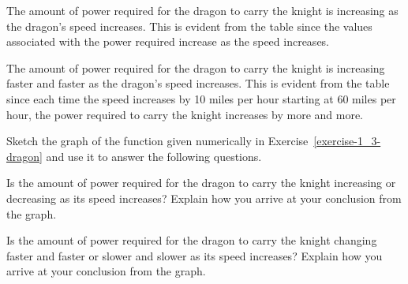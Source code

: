 \begin{solution}
    \begin{parts}
        \item The amount of power required for the dragon to carry the knight is increasing as the dragon's speed increases. This is evident from the table since the values associated with the power required increase as the speed increases.
        \item The amount of power required for the dragon to carry the knight is increasing faster and faster as the dragon's speed increases. This is evident from the table since each time the speed increases by 10 miles per hour starting at 60 miles per hour, the power required to carry the knight increases by more and more.
    \end{parts}
\end{solution}




\begin{exercise}
Sketch the graph of the function given numerically in Exercise~\ref{exercise-1_3-dragon} and use it to answer the following questions.


\begin{parts}
    \item Is the amount of power required for the dragon to carry the knight increasing or decreasing as its speed increases? Explain how you arrive at your conclusion from the graph.
    \item Is the amount of power required for the dragon to carry the knight changing faster and faster or slower and slower as its speed increases? Explain how you arrive at your conclusion from the graph.
\end{parts}

\end{exercise}




